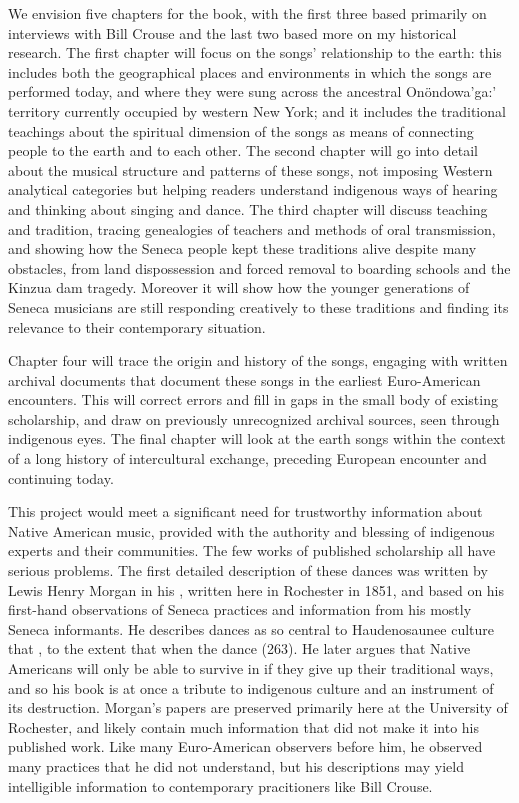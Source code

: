 \documentclass[12pt]{article}
\begin{document}
We envision five chapters for the book, with the first three based primarily
on interviews with Bill Crouse and the last two based more on my historical
research.
The first chapter will focus on the songs' relationship to the earth: this
includes both the geographical places and environments in which the songs are
performed today, and where they were sung across the ancestral Onöndowa'ga:'
territory currently occupied by western New York; and it includes the
traditional teachings about the spiritual dimension of the songs as means of
connecting people to the earth and to each other.
The second chapter will go into detail about the musical structure and
patterns of these songs, not imposing Western analytical categories but
helping readers understand indigenous ways of hearing and thinking about
singing and dance.
The third chapter will discuss teaching and tradition, tracing genealogies of
teachers and methods of oral transmission, and showing how the Seneca people
kept these traditions alive despite many obstacles, from land dispossession
and forced removal to boarding schools and the Kinzua dam tragedy.
Moreover it will show how the younger generations of Seneca musicians are
still responding creatively to these traditions and finding its relevance to
their contemporary situation.

Chapter four will trace the origin and history of the songs, engaging with
written archival documents that document these songs in the earliest
Euro-American encounters.
This will correct errors and fill in gaps in the small body of existing
scholarship, and draw on previously unrecognized archival sources, seen
through indigenous eyes.
The final chapter will look at the earth songs within the context of a long
history of intercultural exchange, preceding European encounter and continuing
today.

This project would meet a significant need for trustworthy information about
Native American music, provided with the authority and blessing of indigenous
experts and their communities.
The few works of published scholarship all have serious problems.
The first detailed description of these dances was written by Lewis Henry
Morgan in his , written
here in Rochester in 1851, and based on his first-hand observations of Seneca
practices and information from his mostly Seneca informants.%
\Autocite{Morgan:League}
He describes dances as so central to Haudenosaunee culture that , to the
extent that when the dance  (263).%
\Autocite[261, 263]{Morgan:League}
He later argues that Native Americans will only be able to survive in
 if they give up their traditional ways, and so his book
is at once a tribute to indigenous culture and an instrument of its
destruction.
Morgan's papers are preserved primarily here at the University of Rochester,
and likely contain much information that did not make it into his published
work.
Like many Euro-American observers before him, he observed many practices that
he did not understand, but his descriptions may yield intelligible information
to contemporary pracitioners like Bill Crouse.
\end{document}
